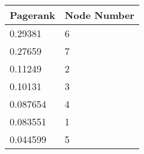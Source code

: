 \begin{tabular}{ll}
Pagerank & Node Number \\ 
\hline 
0.29381 & 6 \\ 
0.27659 & 7 \\ 
0.11249 & 2 \\ 
0.10131 & 3 \\ 
0.087654 & 4 \\ 
0.083551 & 1 \\ 
0.044599 & 5 \\ 
\hline 
\end{tabular}